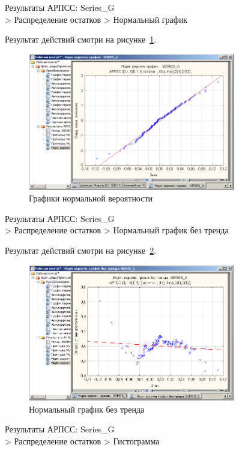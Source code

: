 Результаты АРПСС: Series\_G\\
> Распределение остатков
> Нормальный график

Результат действий смотри на рисунке~\ref{fig:17}.

\begin{figure}[!h]
  \centering

  \includegraphics[height=6cm]
  {inc/17.PNG}

  \caption{Графики нормальной вероятности}

  \label{fig:17}
\end{figure}

\newpage

Результаты АРПСС: Series\_G\\
> Распределение остатков
> Нормальный график без тренда

Результат действий смотри на рисунке~\ref{fig:18}.

\begin{figure}[!h]
  \centering

  \includegraphics[height=6cm]
  {inc/18.PNG}

  \caption{Нормальный график без тренда}

  \label{fig:18}
\end{figure}

Результаты АРПСС: Series\_G\\
> Распределение остатков
> Гистограмма

